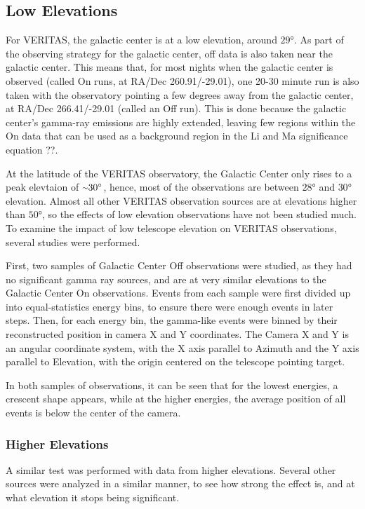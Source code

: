 \subsection{Low Elevations}
For VERITAS, the galactic center is at a low elevation, around $\ang{29}$.
As part of the observing strategy for the galactic center, off data is also taken near the galactic center.
This means that, for most nights when the galactic center is observed (called On runs, at RA/Dec 260.91/-29.01), one 20-30 minute run is also taken with the observatory pointing a few degrees away from the galactic center, at RA/Dec 266.41/-29.01 (called an Off run).
This is done because the galactic center's gamma-ray emissions are highly extended, leaving few regions within the On data that can be used as a background region in the Li and Ma significance equation ??.

At the latitude of the VERITAS observatory, the Galactic Center only rises to a peak elevtaion of $ \nicetilde \ang{30} $, hence, most of the observations are between $\ang{28}$ and $\ang{30}$ elevation.
Almost all other VERITAS observation sources are at elevations higher than $\ang{50}$, so the effects of low elevation observations have not been studied much.
To examine the impact of low telescope elevation on VERITAS observations, several studies were performed.

First, two samples of Galactic Center Off observations were studied, as they had no significant gamma ray sources, and are at very similar elevations to the Galactic Center On observations.
Events from each sample were first divided up into equal-statistics energy bins, to ensure there were enough events in later steps.
Then, for each energy bin, the gamma-like events were binned by their reconstructed position in camera X and Y coordinates.
The Camera X and Y is an angular coordinate system, with the X axis parallel to Azimuth and the Y axis parallel to Elevation, with the origin centered on the telescope pointing target.


In both samples of observations, it can be seen that for the lowest energies, a crescent shape appears, while at the higher energies, the average position of all events is below the center of the camera.


\subsubsection{Higher Elevations}
A similar test was performed with data from higher elevations.
Several other sources were analyzed in a similar manner, to see how strong the effect is, and at what elevation it stops being significant.


